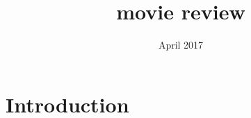 \documentclass{article}
\title{movie review}
\date{April 2017}
\begin{document}
\maketitle

\section{Introduction}
\end{document}
